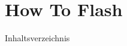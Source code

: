 \documentclass[12pt,utf8]{beamer}
\begin{document}



\section{How To Flash}

\begin{frame}{Inhaltsverzeichnis}
\end{frame}





%

\end{document}
